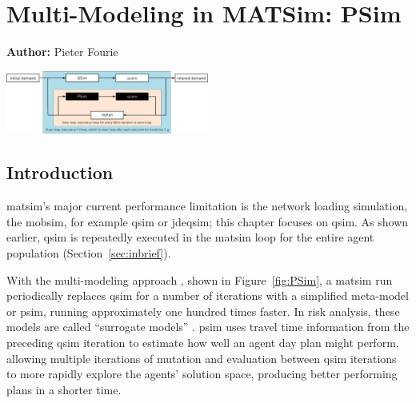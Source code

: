 \chapter{Multi-Modeling in MATSim: PSim}
\label{ch:psim}

\hfill \textbf{Author:} Pieter Fourie

\begin{center} \includegraphics[width=0.5\textwidth, angle=0]{extending/figures/PSim/psim.pdf} \end{center}


\section{Introduction}
\gls{matsim}'s major current performance limitation is the network loading simulation, \ie the \gls{mobsim}, for example \gls{qsim} or \gls{jdeqsim}; 
this chapter focuses on \gls{qsim}. 
As shown earlier, \gls{qsim} is repeatedly executed in the \gls{matsim} loop for the entire agent population (Section~\ref{sec:inbrief}).

With the multi-modeling approach \citep[][]{FourieEtAl_TRR_2013}, shown in Figure~\ref{fig:PSim}, a \gls{matsim} run periodically replaces \gls{qsim} for a number of iterations with a simplified meta-model or \gls{psim}, running approximately one hundred times faster. 
In risk analysis, these models are called ``surrogate models'' \citep[][]{Sudret_APSSRA_2012}. 
\gls{psim} uses travel time information from the preceding \gls{qsim} iteration to estimate how well an agent day plan might perform, allowing multiple iterations of mutation and evaluation between \gls{qsim} iterations to more rapidly explore the agents' solution space, producing better performing plans in a shorter time.

